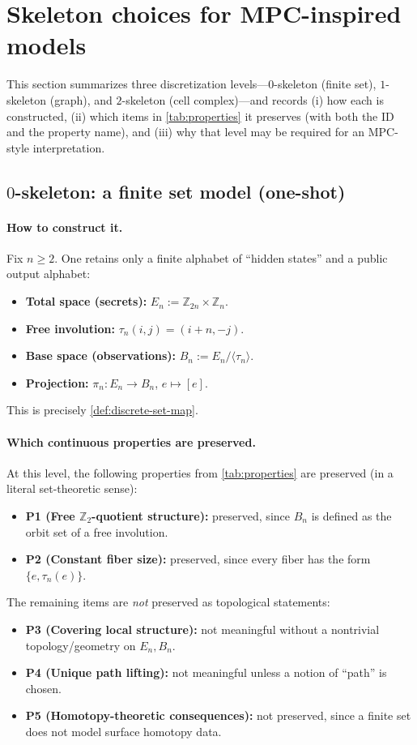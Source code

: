 \documentclass[11pt,a4paper]{article}
\theoremstyle{definition}
\theoremstyle{remark}
\begin{document}
\section{Skeleton choices for MPC-inspired models}
\label{sec:skeleton-choices-mpc}

This section summarizes three discretization levels---\(0\)-skeleton (finite set), \(1\)-skeleton (graph), and \(2\)-skeleton (cell complex)---and records (i) how each is constructed, (ii) which items in \cref{tab:properties} it preserves (with both the ID and the property name), and (iii) why that level may be required for an MPC-style interpretation.

\subsection{\(0\)-skeleton: a finite set model (one-shot)}
\label{sec:sk0}

\paragraph{How to construct it.}
Fix \(n\ge 2\). One retains only a finite alphabet of ``hidden states'' and a public output alphabet:
\begin{itemize}
  \item \textbf{Total space (secrets):} \(E_n:=\mathbb{Z}_{2n}\times\mathbb{Z}_n\).
  \item \textbf{Free involution:} \(\tau_n(i,j)=(i+n,-j)\).
  \item \textbf{Base space (observations):} \(B_n:=E_n/\langle\tau_n\rangle\).
  \item \textbf{Projection:} \(\pi_n:E_n\to B_n\), \(e\mapsto [e]\).
\end{itemize}
This is precisely \cref{def:discrete-set-map}.

\paragraph{Which continuous properties are preserved.}
At this level, the following properties from \cref{tab:properties} are preserved (in a literal set-theoretic sense):
\begin{itemize}
  \item \textbf{P1 (Free \(\mathbb{Z}_2\)-quotient structure):} preserved, since \(B_n\) is defined as the orbit set of a free involution.
  \item \textbf{P2 (Constant fiber size):} preserved, since every fiber has the form \(\{e,\tau_n(e)\}\).
\end{itemize}
The remaining items are \emph{not} preserved as topological statements:
\begin{itemize}
  \item \textbf{P3 (Covering local structure):} not meaningful without a nontrivial topology/geometry on \(E_n,B_n\).
  \item \textbf{P4 (Unique path lifting):} not meaningful unless a notion of ``path'' is chosen.
  \item \textbf{P5 (Homotopy-theoretic consequences):} not preserved, since a finite set does not model surface homotopy data.
\end{itemize}
\end{document}
